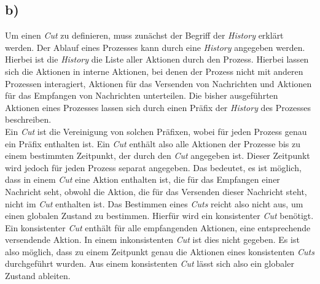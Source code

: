 \documentclass[ngerman]{fbi-aufgabenblatt}
\begin{document}
\subsection*{b)}
Um einen \textit{Cut} zu definieren, muss zunächst der Begriff der \textit{History} erklärt werden. Der Ablauf eines Prozesses kann durch eine \textit{History} angegeben werden. Hierbei ist die \textit{History} die Liste aller Aktionen durch den Prozess. Hierbei lassen sich die Aktionen in interne Aktionen, bei denen der Prozess nicht mit anderen Prozessen interagiert, Aktionen für das Versenden von Nachrichten und Aktionen für das Empfangen von Nachrichten unterteilen. Die bisher ausgeführten Aktionen eines Prozesses lassen sich durch einen Präfix der \textit{History} des Prozesses beschreiben. \\
Ein \textit{Cut} ist die Vereinigung von solchen Präfixen, wobei für jeden Prozess genau ein Präfix enthalten ist. Ein \textit{Cut} enthält also alle Aktionen der Prozesse bis zu einem bestimmten Zeitpunkt, der durch den \textit{Cut} angegeben ist. Dieser Zeitpunkt wird jedoch für jeden Prozess separat angegeben. Das bedeutet, es ist möglich, dass in einem \textit{Cut} eine Aktion enthalten ist, die für das Empfangen einer Nachricht seht, obwohl die Aktion, die für das Versenden dieser Nachricht steht, nicht im \textit{Cut} enthalten ist. Das Bestimmen eines \textit{Cuts} reicht also nicht aus, um einen globalen Zustand zu bestimmen. Hierfür wird ein konsistenter \textit{Cut} benötigt. Ein konsistenter \textit{Cut} enthält für alle empfangenden Aktionen, eine entsprechende versendende Aktion. In einem inkonsistenten \textit{Cut} ist dies nicht gegeben. Es ist also möglich, dass zu einem Zeitpunkt genau die Aktionen eines konsistenten \textit{Cuts} durchgeführt wurden. Aus einem konsistenten \textit{Cut} lässt sich also ein globaler Zustand ableiten.
\end{document}
